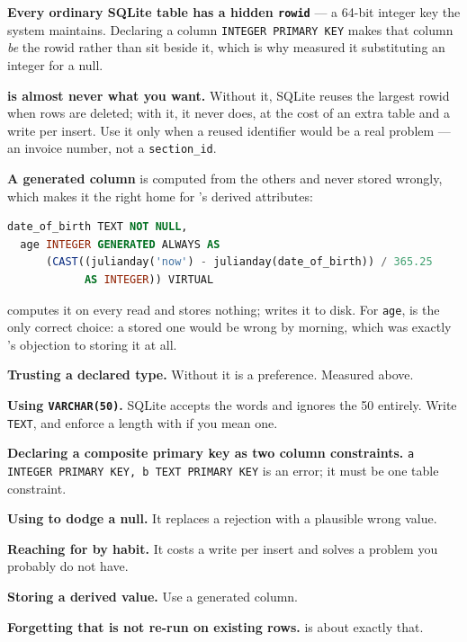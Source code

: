 \begin{conceptbox}
\textbf{Every ordinary SQLite table has a hidden \texttt{rowid}} --- a 64-bit
integer key the system maintains. Declaring a column \texttt{INTEGER PRIMARY
KEY} makes that column \emph{be} the rowid rather than sit beside it, which is
why  measured it substituting an integer for a null.

\smallskip
\textbf{ is almost never what you want.} Without it,
SQLite reuses the largest rowid when rows are deleted; with it, it never does,
at the cost of an extra table and a write per insert. Use it only when a
reused identifier would be a real problem --- an invoice number, not a
\texttt{section\_id}.

\smallskip
\textbf{A generated column} is computed from the others and never stored
wrongly, which makes it the right home for 's derived
attributes:

\begin{lstlisting}[language=sql]
  date_of_birth TEXT NOT NULL,
  age INTEGER GENERATED ALWAYS AS
      (CAST((julianday('now') - julianday(date_of_birth)) / 365.25
            AS INTEGER)) VIRTUAL
\end{lstlisting}

 computes it on every read and stores nothing;
 writes it to disk. For \texttt{age},  is the
only correct choice: a stored one would be wrong by morning, which was exactly
's objection to storing it at all.
\end{conceptbox}

\begin{pitfall}
\begin{tight}
  \item \textbf{Trusting a declared type.} Without  it is a
        preference. Measured above.
  \item \textbf{Using \texttt{VARCHAR(50)}.} SQLite accepts the words and
        ignores the 50 entirely. Write \texttt{TEXT}, and enforce a length
        with  if you mean one.
  \item \textbf{Declaring a composite primary key as two column
        constraints.} \texttt{a INTEGER PRIMARY KEY, b TEXT PRIMARY KEY} is an
        error; it must be one table constraint.
  \item \textbf{Using  to dodge a null.} It replaces a
        rejection with a plausible wrong value.
  \item \textbf{Reaching for  by habit.} It costs a write
        per insert and solves a problem you probably do not have.
  \item \textbf{Storing a derived value.} Use a  generated
        column.
  \item \textbf{Forgetting that  is not re-run on existing rows.}
         is about exactly that.
\end{tight}
\end{pitfall}


